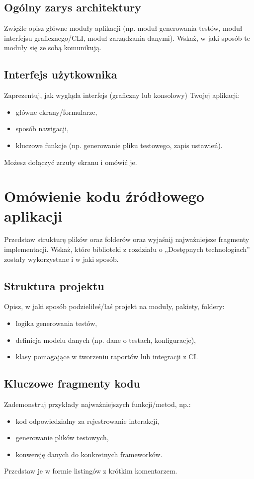\documentclass[12pt]{report}
\begin{document}
\section{Ogólny zarys architektury}
{Zwięźle opisz główne moduły aplikacji (np. moduł generowania testów, moduł interfejsu graficznego/CLI, moduł zarządzania danymi). Wskaż, w jaki sposób te moduły się ze sobą komunikują.}

\section{Interfejs użytkownika}
{Zaprezentuj, jak wygląda interfejs (graficzny lub konsolowy) Twojej aplikacji:
\begin{itemize}
    \item główne ekrany/formularze,
    \item sposób nawigacji,
    \item kluczowe funkcje (np. generowanie pliku testowego, zapis ustawień).
\end{itemize}
Możesz dołączyć zrzuty ekranu i omówić je.}

\chapter{Omówienie kodu źródłowego aplikacji}
{Przedstaw strukturę plików oraz folderów oraz wyjaśnij najważniejsze fragmenty implementacji. Wskaż, które biblioteki z rozdziału o „Dostępnych technologiach” zostały wykorzystane i w jaki sposób.}

\section{Struktura projektu}
{Opisz, w jaki sposób podzieliłeś/łaś projekt na moduły, pakiety, foldery:
\begin{itemize}
    \item logika generowania testów,
    \item definicja modelu danych (np. dane o testach, konfiguracje),
    \item klasy pomagające w tworzeniu raportów lub integracji z CI.
\end{itemize}}

\section{Kluczowe fragmenty kodu}
{Zademonstruj przykłady najważniejszych funkcji/metod, np.:
\begin{itemize}
    \item kod odpowiedzialny za rejestrowanie interakcji,
    \item generowanie plików testowych,
    \item konwersję danych do konkretnych frameworków.
\end{itemize}
Przedstaw je w formie listingów z krótkim komentarzem.}
\end{document}
